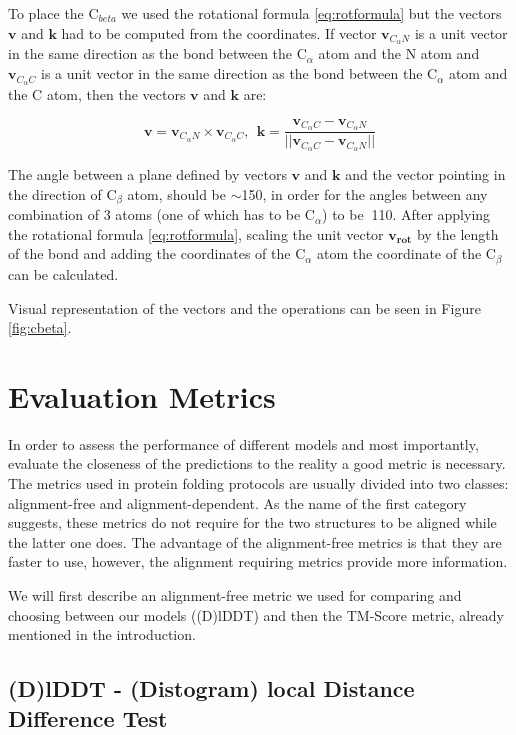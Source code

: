To place the C$_{beta}$ we used the rotational formula \ref{eq:rotformula} but the vectors $\bm{v}$ and $\bm{k}$ had to be computed from the coordinates. 
If vector $\bm{v}_{C_\alpha N}$ is a unit vector in the same direction as the bond between the C$_\alpha$ atom and the N atom and $\bm{v}_{C_\alpha C}$ is a unit vector in the same direction as the bond between the C$_\alpha$ atom and the C atom, then the vectors $\bm{v}$ and $\bm{k}$ are:

$$\bm{v} = \bm{v}_{C_\alpha N} \times  \bm{v}_{C_\alpha C}, ~~ \bm{k} = \frac{\bm{v}_{C_\alpha C} -  \bm{v}_{C_\alpha N}}{||\bm{v}_{C_\alpha C} -  \bm{v}_{C_\alpha N}||}$$

The angle between a plane defined by vectors $\bm{v}$ and $\bm{k}$ and the vector pointing in the direction of C$_\beta$ atom, should be $\sim$150\degree, in order for the angles between any combination of 3 atoms (one of which has to be C$_\alpha$) to be $~$110\degree.
After applying the rotational formula \ref{eq:rotformula}, scaling the unit vector $\bm{v_{rot}}$ by the length of the bond and adding the coordinates of the C$_\alpha$ atom the coordinate of the C$_\beta$ can be calculated.

Visual representation of the vectors and the operations can be seen in Figure \ref{fig:cbeta}.

\section{Evaluation Metrics}

In order to assess the performance of different models and most importantly, evaluate the closeness of the predictions to the reality a good metric is necessary. The metrics used in protein folding protocols are usually divided into two classes: alignment-free and alignment-dependent. As the name of the first category suggests, these metrics do not require for the two structures to be aligned while the latter one does. The advantage of the alignment-free metrics is that they are faster to use, however, the alignment requiring metrics provide more information. 

We will first describe an alignment-free metric we used for comparing and choosing between our models ((D)lDDT) and then the TM-Score metric, already mentioned in the introduction.

\subsection{(D)lDDT - (Distogram) local Distance Difference Test}

